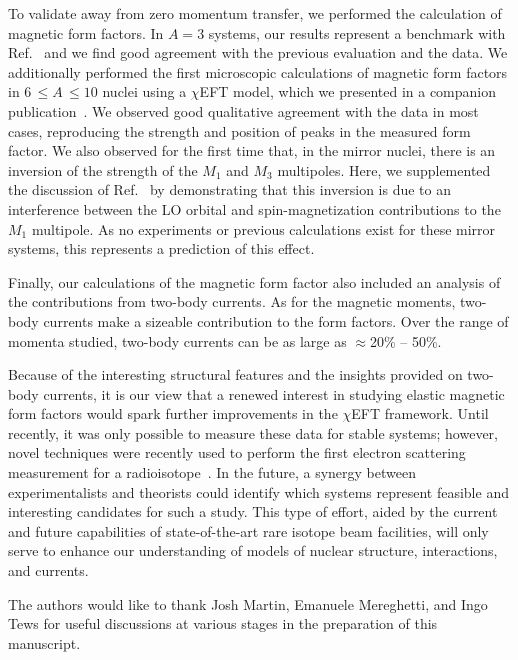 \documentclass[aps,prc,floatfix,showpacs,twocolumn, preprintnumbers]{revtex4-2}
\begin{document}
To validate away from zero momentum transfer, we performed the calculation of magnetic form factors. In $A=3$ systems, our results represent a benchmark with Ref.~\cite{Gnech:2022vwr} and we find good agreement with the previous evaluation and the data. We additionally performed the first microscopic calculations of magnetic form factors in $6\,\leq A\,\leq 10$ nuclei using a $\chi$EFT model, which we presented in a companion publication~\cite{prl}. We observed good qualitative agreement with the data in most cases, reproducing the strength and position of peaks in the measured form factor. We also observed for the first time that, in the mirror nuclei, there is an inversion of the strength of the $M_1$ and $M_3$ multipoles. Here, we supplemented the discussion of Ref.~\cite{prl} by demonstrating that this inversion is due to an interference between the LO orbital and spin-magnetization contributions to the $M_1$ multipole. As no experiments or previous calculations exist for these mirror systems, this represents a prediction of this effect. 

Finally, our calculations of the magnetic form factor also included an analysis of the contributions from two-body currents. As for the magnetic moments, two-body currents make a sizeable contribution to the form factors. Over the range of momenta studied, two-body currents can be as large as ${\approx}$20\% -- 50\%.

Because of the interesting structural features and the insights provided on two-body currents, it is our view that a renewed interest in studying elastic magnetic form factors would spark further improvements in the $\chi$EFT framework. Until recently, it was only possible to measure these data for stable systems; however, novel techniques were recently used to perform the first electron scattering measurement for a radioisotope~\cite{Tsukada:2023}. In the future, a synergy between experimentalists and theorists could identify which systems represent feasible and interesting candidates for such a study. This type of effort, aided by the current and future capabilities of state-of-the-art rare isotope beam facilities, will only serve to enhance our understanding of models of nuclear structure, interactions, and currents. 


\acknowledgments 

The authors would like to thank Josh Martin, Emanuele Mereghetti, and Ingo Tews for useful discussions at various stages in the preparation of this manuscript.
\end{document}

